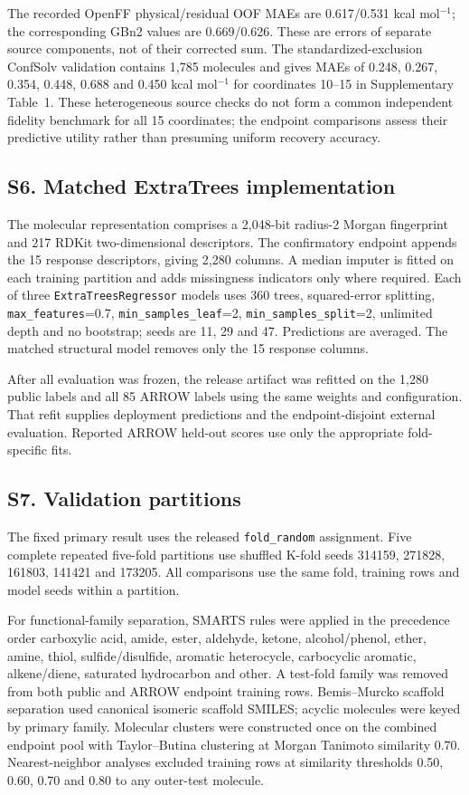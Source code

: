 The recorded OpenFF physical/residual OOF MAEs are 0.617/0.531 kcal mol$^{-1}$;
the corresponding GBn2 values are 0.669/0.626. These are errors of separate source
components, not of their corrected sum. The standardized-exclusion ConfSolv
validation contains 1,785 molecules and gives MAEs of 0.248, 0.267, 0.354, 0.448,
0.688 and 0.450 kcal mol$^{-1}$ for coordinates 10--15 in Supplementary Table~1.
These heterogeneous source checks do not form a common independent fidelity
benchmark for all 15 coordinates; the endpoint comparisons assess their predictive
utility rather than presuming uniform recovery accuracy.

\subsection*{S6. Matched ExtraTrees implementation}

The molecular representation comprises a 2,048-bit radius-2 Morgan fingerprint and
217 RDKit two-dimensional descriptors. The confirmatory endpoint appends the 15 response descriptors,
giving 2,280 columns. A median imputer is fitted on each training partition and adds
missingness indicators only where required. Each of three
\texttt{ExtraTreesRegressor} models uses 360 trees, squared-error splitting,
\texttt{max\_features}=0.7, \texttt{min\_samples\_leaf}=2,
\texttt{min\_samples\_split}=2, unlimited depth and no bootstrap; seeds are 11, 29
and 47. Predictions are averaged. The matched structural model removes only the 15
response columns.

After all evaluation was frozen, the release artifact was refitted on the 1,280
public labels and all 85 ARROW labels using the same weights and configuration.
That refit supplies deployment predictions and the endpoint-disjoint external
evaluation. Reported ARROW held-out scores use only the appropriate fold-specific
fits.

\subsection*{S7. Validation partitions}

The fixed primary result uses the released \texttt{fold\_random} assignment. Five
complete repeated five-fold partitions use shuffled K-fold seeds 314159, 271828,
161803, 141421 and 173205. All comparisons use the same fold, training rows and model
seeds within a partition.

For functional-family separation, SMARTS rules were applied in the precedence order
carboxylic acid, amide, ester, aldehyde, ketone, alcohol/phenol, ether, amine, thiol,
sulfide/disulfide, aromatic heterocycle, carbocyclic aromatic, alkene/diene,
saturated hydrocarbon and other. A test-fold family was removed from both public and
ARROW endpoint training rows. Bemis--Murcko scaffold separation used canonical
isomeric scaffold SMILES; acyclic molecules were keyed by primary family. Molecular
clusters were constructed once on the combined endpoint pool with Taylor--Butina
clustering at Morgan Tanimoto similarity 0.70. Nearest-neighbor analyses excluded
training rows at similarity thresholds 0.50, 0.60, 0.70 and 0.80 to any outer-test
molecule.

